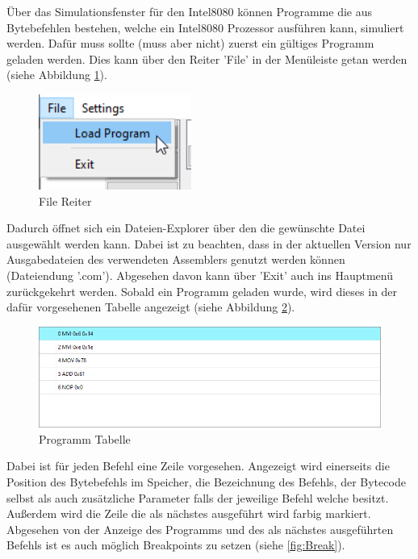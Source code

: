\documentclass[12pt]{article}
\begin{document}
\noindent
Über das Simulationsfenster für den Intel8080 können Programme die aus Bytebefehlen bestehen, welche ein Intel8080 Prozessor ausführen kann, simuliert werden. Dafür muss sollte (muss aber nicht) zuerst ein gültiges Programm geladen werden. Dies kann über den Reiter 'File' in der Menüleiste getan werden (siehe Abbildung \ref{fig:LoadFile}).\vspace{10pt}

\begin{figure}[H]
\centering
\includegraphics[width=5cm]{bilder/LoadFile}
\caption{File Reiter}
\label{fig:LoadFile}
\end{figure}

\noindent
Dadurch öffnet sich ein Dateien-Explorer über den die gewünschte Datei ausgewählt werden kann. Dabei ist zu beachten, dass in der aktuellen Version nur Ausgabedateien des verwendeten Assemblers genutzt werden können (Dateiendung '.com'). Abgesehen davon kann über 'Exit' auch ins Hauptmenü zurückgekehrt werden. Sobald ein Programm geladen wurde, wird dieses in der dafür vorgesehenen Tabelle angezeigt (siehe Abbildung \ref{fig:ProgTable}).\vspace{10pt}

\begin{figure}[H]
\centering
\includegraphics[width=15cm]{bilder/Program_table}
\caption{Programm Tabelle}
\label{fig:ProgTable}
\end{figure}

\noindent
Dabei ist für jeden Befehl eine Zeile vorgesehen. Angezeigt wird einerseits die Position des Bytebefehls im Speicher, die Bezeichnung des Befehls, der Bytecode selbst als auch zusätzliche Parameter falls der jeweilige Befehl welche besitzt. Außerdem wird die Zeile die als nächstes ausgeführt wird farbig markiert. Abgesehen von der Anzeige des Programms und des als nächstes ausgeführten Befehls ist es auch möglich Breakpoints zu setzen (siehe \ref{fig:Break}).\vspace{10pt}
\end{document}
